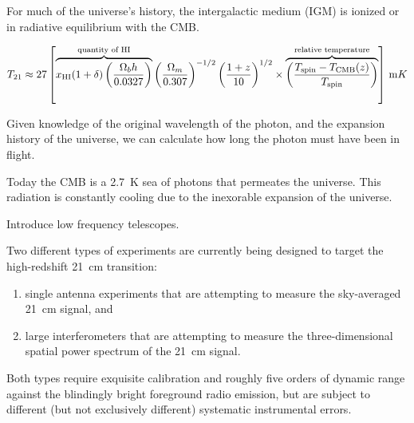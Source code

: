 \begin{bibunit}
For much of the universe's history, the intergalactic medium (IGM) is ionized or in radiative
equilibrium with the CMB.


\begin{equation}
    T_{21} \approx 27 \left[
        \overbrace{
            x_\text{HI} (1+\delta)
            \left(\frac{\Omega_b h}{0.0327}\right)
        }^{\text{quantity of HI}}
        \left(\frac{\Omega_m}{0.307}\right)^{-1/2}
        \left(\frac{1+z}{10}\right)^{1/2} \linebreak \times
        \overbrace{
            \left(\frac{T_\text{spin} - T_\text{CMB}(z)}{T_\text{spin}}\right)
        }^{\text{relative temperature}}
    \right] \, {\rm mK}
\end{equation}
\citep{2012RPPh...75h6901P}






Given knowledge of the
original wavelength of the photon, and the expansion history of the universe, we can calculate how
long the photon must have been in flight.


Today the CMB is a 2.7~K sea of photons that permeates the universe. This radiation is constantly
cooling due to the inexorable expansion of the universe.


Introduce low frequency telescopes.

Two different types of experiments are currently being designed to target the high-redshift 21~cm
transition:
\begin{enumerate}
    \item single antenna experiments that are attempting to measure the sky-averaged 21~cm signal,
        and
    \item large interferometers that are attempting to measure the three-dimensional spatial power
        spectrum of the 21~cm signal.
\end{enumerate}
Both types require exquisite calibration and roughly five orders of dynamic range against the
blindingly bright foreground radio emission, but are subject to different (but not exclusively
different) systematic instrumental errors.


\end{bibunit}
